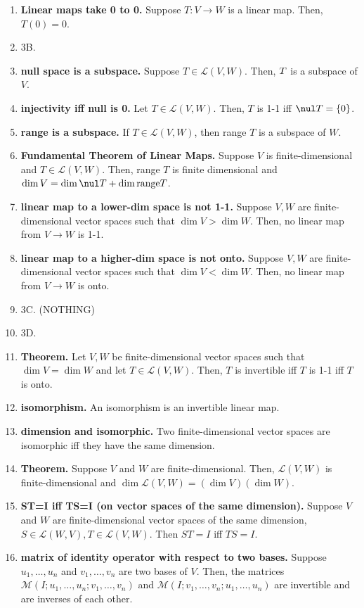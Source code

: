 \begin{enumerate}
	\item \textbf{Linear maps take 0 to 0. } Suppose $T: V \to W$ is a linear map. Then, $T(0)=0$. 
	\item 3B. 
	\item \textbf{null space is a subspace. } Suppose $T \in \mathscr{L}(V,W)$. Then, $\null T$ is a subspace of $V$. 
	\item \textbf{injectivity iff null is 0. } Let $T \in \mathscr{L}(V,W)$. Then, $T$ is 1-1 iff $\nul T = \{0\}$. 
	\item \textbf{range is a subspace. } If $T \in \mathscr{L}(V,W)$, then range $T$ is a subspace of $W$. 
	\item \textbf{Fundamental Theorem of Linear Maps. } Suppose $V$ is finite-dimensional and $T \in \mathscr{L}(V,W)$. Then, range $T$ is finite dimensional and $\dim V = \dim \nul T + \dim \textrm{range} T$. 
	\item \textbf{linear map to a lower-dim space is not 1-1. } Suppose $V,W$ are finite-dimensional vector spaces such that $\dim V > \dim W$. Then, no linear map from $V \to W$ is 1-1. 
	\item \textbf{linear map to a higher-dim space is not onto. } Suppose $V,W$ are finite-dimensional vector spaces such that $\dim V < \dim W$. Then, no linear map from $V \to W$ is onto. 
	\item 3C. (NOTHING)
	\item 3D. 
	\item \textbf{Theorem. } Let $V,W$ be finite-dimensional vector spaces such that $\dim V = \dim W$ and let $T \in \mathscr{L}(V,W)$. Then, $T$ is invertible iff $T$ is 1-1 iff $T$ is onto. 
	\item \textbf{isomorphism. } An isomorphism is an invertible linear map. 
	\item \textbf{dimension and isomorphic. } Two finite-dimensional vector spaces are isomorphic iff they have the same dimension. 
	\item \textbf{Theorem. } Suppose $V$ and $W$ are finite-dimensional. Then, $\mathscr{L}(V,W)$ is finite-dimensional and $\dim \mathscr{L}(V,W) = (\dim V)(\dim W)$.
	\item \textbf{ST=I iff TS=I (on vector spaces of the same dimension). } Suppose $V$ and $W$ are finite-dimensional vector spaces of the same dimension, $S \in \mathscr{L}(W,V), T \in \mathscr{L}(V,W)$. Then $ST=I$ iff $TS=I$. 
	\item \textbf{matrix of identity operator with respect to two bases. } Suppose $u_1,\dots,u_n$ and $v_1,\dots,v_n$ are two bases of $V$. Then, the matrices $\mathscr{M}(I; u_1,\dots,u_n; v_1,\dots,v_n)$ and $\mathscr{M}(I; v_1,\dots,v_n; u_1,\dots,u_n)$ are invertible and are inverses of each other. 

\end{enumerate}
